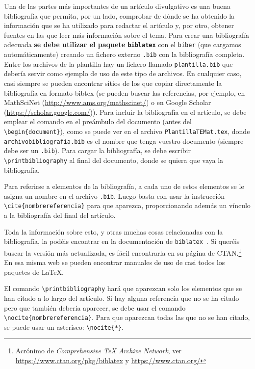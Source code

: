 \documentclass[bibtex, anon]{TEMat-article}
\begin{document}
Una de las partes más importantes de un artículo divulgativo es una buena bibliografía que permita, por un lado, comprobar de dónde se ha obtenido la información que se ha utilizado para redactar el artículo y, por otro, obtener fuentes en las que leer más información sobre el tema.
Para crear una bibliografía adecuada \textbf{se debe utilizar el paquete \texttt{biblatex}} con el  \verb+biber+ (que cargamos automáticamente) creando un fichero externo \verb+.bib+ con la bibliografía completa.
Entre los archivos de la plantilla hay un fichero llamado \verb+plantilla.bib+ que debería servir como ejemplo de uso de este tipo de archivos.
En cualquier caso, casi siempre se pueden encontrar sitios de los que copiar directamente la bibliografía en formato bibtex (se pueden buscar las referencias, por ejemplo, en MathSciNet (\url{http://www.ams.org/mathscinet/}) o en Google Scholar (\url{https://scholar.google.com/})).
Para incluir la bibliografía en el artículo, se debe emplear el comando \verb++ en el preámbulo del documento (antes del \verb+\begin{document}+), como se puede ver en el archivo \verb+PlantillaTEMat.tex+, donde \verb+archivobibliografia.bib+ es el nombre que tenga vuestro documento (siempre debe ser un \verb+.bib+).
Para cargar la bibliografía, se debe escribir \verb+\printbibliography+ al final del documento, donde se quiera que vaya la bibliografía.

Para referirse a elementos de la bibliografía, a cada uno de estos elementos se le asigna un nombre en el archivo \verb+.bib+.
Luego basta con usar la instrucción \verb+\cite{nombrereferencia}+ para que aparezca, proporcionando además un vínculo a la bibliografía del final del artículo.

Toda la información sobre esto, y otras muchas cosas relacionadas con la bibliografía, la podéis encontrar en la documentación de \verb+biblatex+~\cite{biblatex}.
Si queréis buscar la versión más actualizada, es fácil encontrarla en su página de CTAN.\footnote{Acrónimo de \emph{Comprehensive \protect\TeX{} Archive Network}, ver \url{https://www.ctan.org/pkg/biblatex} y \url{https://www.ctan.org/}}
En esa misma web se pueden encontrar manuales de uso de casi todos los paquetes de \LaTeX.

\begin{nota}
El comando \verb+\printbibliography+ hará que aparezcan solo los elementos que se han citado a lo largo del artículo.
Si hay alguna referencia que no se ha citado pero que también debería aparecer, se debe usar el comando \verb+\nocite{nombrereferencia}+.
Para que aparezcan todas las que no se han citado, se puede usar un asterisco: \verb+\nocite{*}+.
\end{nota}
\end{document}
